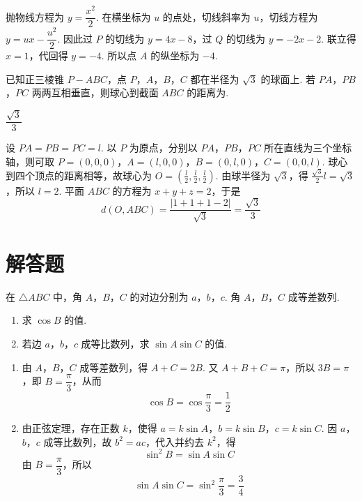 \begin{solution}
抛物线方程为 \(y=\dfrac{x^2}{2}\). 在横坐标为 \(u\) 的点处，切线斜率为 \(u\)，切线方程为 \(y=ux-\dfrac{u^2}{2}\). 因此过 \(P\) 的切线为 \(y=4x-8\)，过 \(Q\) 的切线为 \(y=-2x-2\). 联立得 \(x=1\)，代回得 \(y=-4\). 所以点 \(A\) 的纵坐标为 \(-4\).
\end{solution}

\begin{problem}
已知正三棱锥 \(P - ABC\)，点 \(P\)，\(A\)，\(B\)，\(C\) 都在半径为 \(\sqrt{3}\) 的球面上. 若 \(PA\)，\(PB\)，\(PC\) 两两互相垂直，则球心到截面 \(ABC\) 的距离为\fillinblank{}.
\end{problem}

\begin{answer}
\(\dfrac{\sqrt{3}}{3}\)
\end{answer}

\begin{solution}
设 \(PA=PB=PC=l\). 以 \(P\) 为原点，分别以 \(PA\)，\(PB\)，\(PC\) 所在直线为三个坐标轴，则可取
\(P=(0,0,0)\)，\(A=(l,0,0)\)，\(B=(0,l,0)\)，\(C=(0,0,l)\).
球心到四个顶点的距离相等，故球心为 \(O=(\frac l2,\frac l2,\frac l2)\). 由球半径为 \(\sqrt3\)，得 \(\frac{\sqrt3}{2}l=\sqrt3\)，所以 \(l=2\). 平面 \(ABC\) 的方程为 \(x+y+z=2\)，于是
\[
d(O,ABC)=\frac{|1+1+1-2|}{\sqrt3}=\frac{\sqrt3}{3}
\]
\end{solution}

\section{解答题}

\begin{problem}
在 \(\triangle ABC\) 中，角 \(A\)，\(B\)，\(C\) 的对边分别为 \(a\)，\(b\)，\(c\). 角 \(A\)，\(B\)，\(C\) 成等差数列.

\begin{enumerate}
\item 求 \(\cos B\) 的值.
\item 若边 \(a\)，\(b\)，\(c\) 成等比数列，求 \(\sin A \sin C\) 的值.
\end{enumerate}
\end{problem}

\begin{solution}
\begin{enumerate}
\item 由 \(A\)，\(B\)，\(C\) 成等差数列，得 \(A+C=2B\). 又 \(A+B+C=\pi\)，所以 \(3B=\pi\)，即 \(B=\dfrac\pi3\)，从而
\[
\cos B=\cos\frac\pi3=\frac12
\]
\item 由正弦定理，存在正数 \(k\)，使得 \(a=k\sin A\)，\(b=k\sin B\)，\(c=k\sin C\). 因 \(a\)，\(b\)，\(c\) 成等比数列，故 \(b^2=ac\)，代入并约去 \(k^2\)，得
\[
\sin^2B=\sin A\sin C
\]
由 \(B=\dfrac\pi3\)，所以
\[
\sin A\sin C=\sin^2\frac\pi3=\frac34
\]
\end{enumerate}
\end{solution}

